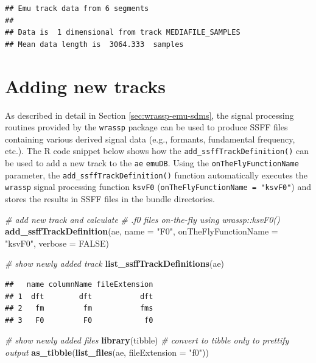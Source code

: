 \documentclass[]{book}
\newenvironment{Shaded}{\begin{snugshade}}{\end{snugshade}}
\newcommand{\CommentTok}[1]{\textcolor[rgb]{0.56,0.35,0.01}{\textit{#1}}}
\newcommand{\DataTypeTok}[1]{\textcolor[rgb]{0.13,0.29,0.53}{#1}}
\newcommand{\KeywordTok}[1]{\textcolor[rgb]{0.13,0.29,0.53}{\textbf{#1}}}
\newcommand{\NormalTok}[1]{#1}
\newcommand{\OtherTok}[1]{\textcolor[rgb]{0.56,0.35,0.01}{#1}}
\newcommand{\StringTok}[1]{\textcolor[rgb]{0.31,0.60,0.02}{#1}}
\begin{document}
\begin{verbatim}
## Emu track data from 6 segments
## 
## Data is  1 dimensional from track MEDIAFILE_SAMPLES 
## Mean data length is  3064.333  samples
\end{verbatim}

\hypertarget{adding-new-tracks}{%
\section{Adding new tracks}\label{adding-new-tracks}}

As described in detail in Section \ref{sec:wrassp-emu-sdms}, the signal processing routines provided by the \texttt{wrassp} package can be used to produce SSFF files containing various derived signal data (e.g., formants, fundamental frequency, etc.). The R code snippet below shows how the \texttt{add\_ssffTrackDefinition()} can be used to add a new track to the \texttt{ae} \texttt{emuDB}. Using the \texttt{onTheFlyFunctionName} parameter, the \texttt{add\_ssffTrackDefinition()} function automatically executes the \texttt{wrassp} signal processing function \texttt{ksvF0} (\texttt{onTheFlyFunctionName\ =\ "ksvF0"}) and stores the results in SSFF files in the bundle directories.

\begin{Shaded}
\begin{Highlighting}[]
\CommentTok{# add new track and calculate}
\CommentTok{# .f0 files on-the-fly using wrassp::ksvF0()}
\KeywordTok{add_ssffTrackDefinition}\NormalTok{(ae,}
                        \DataTypeTok{name =} \StringTok{"F0"}\NormalTok{,}
                        \DataTypeTok{onTheFlyFunctionName =} \StringTok{"ksvF0"}\NormalTok{,}
                        \DataTypeTok{verbose =} \OtherTok{FALSE}\NormalTok{)}

\CommentTok{# show newly added track}
\KeywordTok{list_ssffTrackDefinitions}\NormalTok{(ae)}
\end{Highlighting}
\end{Shaded}

\begin{verbatim}
##   name columnName fileExtension
## 1  dft        dft           dft
## 2   fm         fm           fms
## 3   F0         F0            f0
\end{verbatim}

\begin{Shaded}
\begin{Highlighting}[]
\CommentTok{# show newly added files}
\KeywordTok{library}\NormalTok{(tibble) }\CommentTok{# convert to tibble only to prettify output}
\KeywordTok{as_tibble}\NormalTok{(}\KeywordTok{list_files}\NormalTok{(ae, }\DataTypeTok{fileExtension =} \StringTok{"f0"}\NormalTok{))}
\end{Highlighting}
\end{Shaded}
\end{document}
